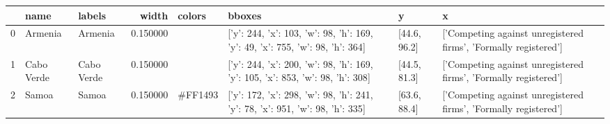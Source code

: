 \begin{tabular}{lllrllll}
\toprule
 & name & labels & width & colors & bboxes & y & x \\
\midrule
0 & Armenia & Armenia & 0.150000 & #40E0D0 & [{'y': 244, 'x': 103, 'w': 98, 'h': 169}, {'y': 49, 'x': 755, 'w': 98, 'h': 364}] & [44.6, 96.2] & ['Competing against unregistered firms', 'Formally registered'] \\
1 & Cabo Verde & Cabo Verde & 0.150000 & #483D8B & [{'y': 244, 'x': 200, 'w': 98, 'h': 169}, {'y': 105, 'x': 853, 'w': 98, 'h': 308}] & [44.5, 81.3] & ['Competing against unregistered firms', 'Formally registered'] \\
2 & Samoa & Samoa & 0.150000 & #FF1493 & [{'y': 172, 'x': 298, 'w': 98, 'h': 241}, {'y': 78, 'x': 951, 'w': 98, 'h': 335}] & [63.6, 88.4] & ['Competing against unregistered firms', 'Formally registered'] \\
\bottomrule
\end{tabular}
